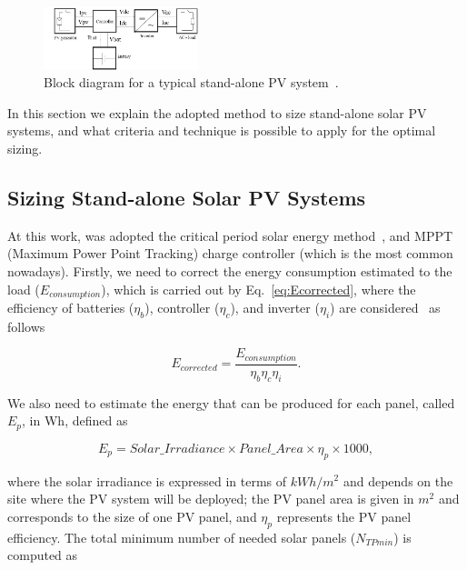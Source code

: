 \documentclass[journal]{IEEEtran}
\begin{document}
\begin{figure}[h]
\includegraphics[width=0.4\textwidth]{blockdiagramPVS2_rev}
\centering
\caption{Block diagram for a typical stand-alone PV system~\cite{Hansen}.}
\label{fig:blockdiagram} 
\end{figure}

In this section we explain the adopted method to size stand-alone solar PV systems, and what criteria and technique is possible to apply for the optimal sizing. 

\subsection{Sizing Stand-alone Solar PV Systems}
\label{sec:sizing}

At this work, was adopted the critical period solar energy method~\cite{Pinho}, and MPPT (Maximum Power Point Tracking) charge controller (which is the most common nowadays). Firstly, we need to correct the energy consumption estimated to the load ($E_{consumption}$), which is carried out by Eq.~\eqref{eq:Ecorrected}, where the efficiency of batteries ($\eta_{b}$), controller ($\eta_{c}$), and inverter ($\eta_{i}$) are considered~\cite{Pinho} as follows

\begin{equation}
\label{eq:Ecorrected}
E_{corrected} = \dfrac{E_{consumption}}{\eta_{b} \eta_{c} \eta_{i} }.
\end{equation}

We also need to estimate the energy that can be produced for each panel, called $E_{p}$, in Wh, defined as

\begin{equation}
\label{eq:Ep}
E_{p} = Solar\_Irradiance \times Panel\_Area \times \eta_{p} \times 1000,
\end{equation}

\noindent where the solar irradiance is expressed in terms of $kWh/m^{2}$ and depends on the site where the PV system will be deployed; 
the PV panel area is given in $m^{2}$ and corresponds to the size of one PV panel, and $\eta_{p}$ represents the PV panel efficiency.
The total minimum number of needed solar panels ($N_{TPmin}$) is computed as
\end{document}
